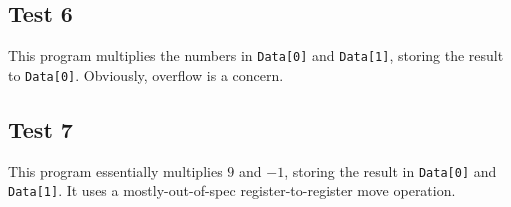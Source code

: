 \documentclass[11pt,letterpaper]{article}
\begin{document}
\subsection{Test 6}
This program multiplies the numbers in \texttt{Data[0]} and \texttt{Data[1]}, storing the result to \texttt{Data[0]}. Obviously, overflow is a concern.

\subsection{Test 7}
This program essentially multiplies $9$ and $-1$, storing the result in \texttt{Data[0]} and \texttt{Data[1]}. It uses a mostly-out-of-spec register-to-register move operation.
\end{document}
